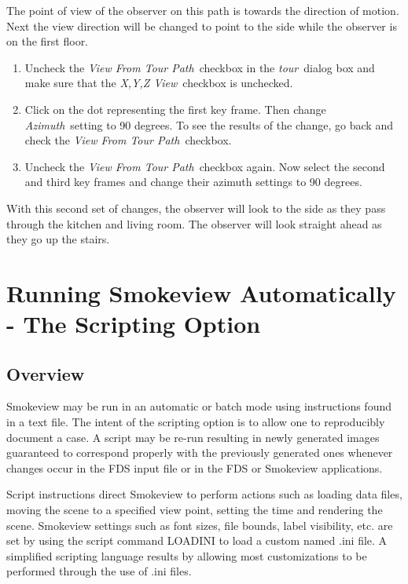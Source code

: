 \documentclass[11pt,twoside]{book}
\begin{document}
The point of view of the observer on this path is towards the
direction of motion. Next the view direction will be changed to
point to the side while the observer is on the first floor.

\begin{enumerate}
\item Uncheck the {\em View From Tour Path}\ checkbox in the {\em
tour}\ dialog box and make sure that the {\em X,Y,Z View}\
checkbox is unchecked.

\item Click on the dot representing the first key frame. Then
change {\em Azimuth}\ setting to 90 degrees.  To see the results
of the change, go back and check the {\em View From Tour Path}\
checkbox.

\item Uncheck the {\em View From Tour Path}\ checkbox again. Now
select the second and third key frames and change their azimuth
settings to 90 degrees.
\end{enumerate}

With this second set of changes, the observer will look to the
side as they pass through the kitchen and living room.  The
observer will look straight ahead as they go up the stairs.


\chapter{Running Smokeview Automatically - The Scripting Option}
\label{chapter:scripting}
\section{Overview}
Smokeview may be run in an automatic or batch mode using
instructions found in a text file.
The intent of the scripting option is to allow one to reproducibly document a case.
A script may be re-run resulting in newly generated images guaranteed
to correspond properly with the previously generated
ones whenever changes occur in the FDS input file or in the FDS or Smokeview applications.

Script instructions direct Smokeview to perform actions such as
loading data files, moving the scene to a specified view point,
setting the time and rendering the scene.
Smokeview settings such as font sizes, file bounds, label visibility,
etc. are set by using the script command LOADINI to load a custom named .ini file.
A simplified scripting language results by allowing
most customizations to be performed through the use of .ini files.
\end{document}
